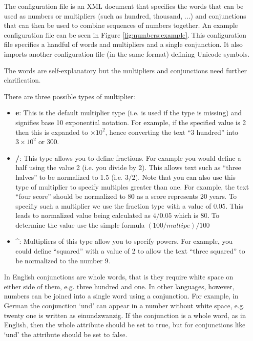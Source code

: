 The configuration file is an XML document that specifies the words that can be
used as numbers or multipliers (such as hundred, thousand, ...) and conjunctions
that can then be used to combine sequences of numbers together. An example
configuration file can be seen in Figure \ref{fig:numbers:example}. This
configuration file specifies a handful of words and multipliers and a single
conjunction. It also imports another configuration file (in the same format)
defining Unicode symbols.

The words are self-explanatory but the multipliers and conjunctions need further
clarification.

There are three possible types of multiplier:

\begin{itemize}
\item \textbf{e}: This is the default multiplier type (i.e. is used if the type
is missing) and signifies base 10 exponential notation. For example, if the specified
value is 2 then this is expanded to $\times 10^2$, hence converting the text ``3 hundred'' into
$3 \times 10^2$ or 300.
\item \textbf{/}: This type allows you to define fractions. For example you would define a half using the value 2 (i.e.
you divide by 2). This allows text such as ``three halves'' to be normalized to 1.5 (i.e. $3/2$). Note that
you can also use this type of multiplier to specify multiples greater than one. For example, the text ``four score''
should be normalized to 80 as a score represents 20 years. To specifiy such a multiplier we use the fraction type
with a value of 0.05. This leads to normalized value being calculated as $4/0.05$ which is 80. To determine the
value use the simple formula $(100/multipe)/100$
\item \textbf{\^}: Multipliers of this type allow you to specify powers. For example, you could define ``squared'' with
a value of 2 to allow the text ``three squared'' to be normalized to the number 9.
\end{itemize}

In English conjunctions
are whole words, that is they require white space on either side of them, e.g.
three hundred and one. In other languages, however, numbers can be joined into a
single word using a conjunction. For example, in German the conjunction `und'
can appear in a number without white space, e.g. twenty one is written as
einundzwanzig. If the conjunction is a whole word, as in English, then the whole
attribute should be set to true, but for conjunctions like `und' the attribute
should be set to false.

